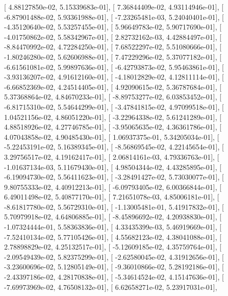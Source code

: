 \documentclass{article}
\begin{document}
       [  4.88127850e-02,   5.15339683e-01],
       [  7.36844409e-02,   4.93114946e-01],
       [ -6.87901488e-02,   5.93361988e-01],
       [ -7.23265481e-03,   5.24040401e-01],
       [ -4.35120640e-02,   5.53257455e-01],
       [  5.96649783e-02,   5.90717690e-01],
       [ -4.01750862e-02,   5.58342967e-01],
       [  2.82732162e-03,   4.42884497e-01],
       [ -8.84470992e-02,   4.72284250e-01],
       [  7.68522297e-02,   5.51080666e-01],
       [ -1.80246280e-02,   5.62606988e-01],
       [  7.47229296e-02,   5.37077182e-01],
       [ -6.61561081e-02,   5.99897636e-01],
       [ -6.42793873e-02,   5.95463861e-01],
       [ -3.93136207e-02,   4.91612160e-01],
       [ -4.18012829e-02,   4.12811114e-01],
       [ -6.66852369e-02,   4.24514405e-01],
       [  4.92090615e-02,   5.36787684e-01],
       [  5.37368864e-02,   4.84670233e-01],
       [ -8.89753277e-02,   6.03853452e-01],
       [ -6.81715310e-02,   5.54644299e-01],
       [ -3.47841815e-02,   4.97099518e-01],
       [  1.04521156e-02,   4.86051220e-01],
       [ -3.22964338e-02,   5.61241289e-01],
       [  4.88518926e-02,   4.27746785e-01],
       [ -3.95065635e-02,   4.36361786e-01],
       [  4.07043858e-02,   4.90485430e-01],
       [  1.06937375e-01,   5.34205034e-01],
       [ -5.22453191e-02,   5.16389345e-01],
       [ -8.56869545e-02,   4.22145654e-01],
       [  3.29756517e-02,   4.19162417e-01],
       [  2.06814161e-03,   4.79336763e-01],
       [ -1.01637134e-03,   5.11679430e-01],
       [  4.98504344e-02,   4.43285895e-01],
       [ -6.19094730e-02,   5.56411623e-01],
       [ -3.28491427e-02,   5.73030077e-01],
       [  9.80755333e-02,   4.40912213e-01],
       [ -6.09793405e-02,   6.00366844e-01],
       [  6.49011498e-02,   5.40877170e-01],
       [  7.21651078e-03,   4.85006181e-01],
       [ -8.61817780e-02,   5.56729310e-01],
       [ -1.13005481e-01,   5.41917832e-01],
       [  5.70979918e-02,   4.64806885e-01],
       [ -8.45896692e-02,   4.20938830e-01],
       [ -1.07324444e-01,   5.58363836e-01],
       [  4.33435399e-03,   5.46919669e-01],
       [ -7.52410134e-02,   5.77105426e-01],
       [  4.55682123e-02,   4.38041088e-01],
       [  2.78898829e-02,   4.25132517e-01],
       [ -5.12609185e-02,   4.35759764e-01],
       [ -2.09549439e-02,   5.82375299e-01],
       [ -2.62580045e-02,   4.31912656e-01],
       [ -3.23600696e-02,   5.12805149e-01],
       [ -9.36010866e-02,   5.28192186e-01],
       [ -2.43397186e-02,   4.28170838e-01],
       [ -5.34614524e-02,   4.15147636e-01],
       [ -7.69973969e-02,   4.76508132e-01],
       [  6.62658271e-02,   5.23917031e-01],
\end{document}
